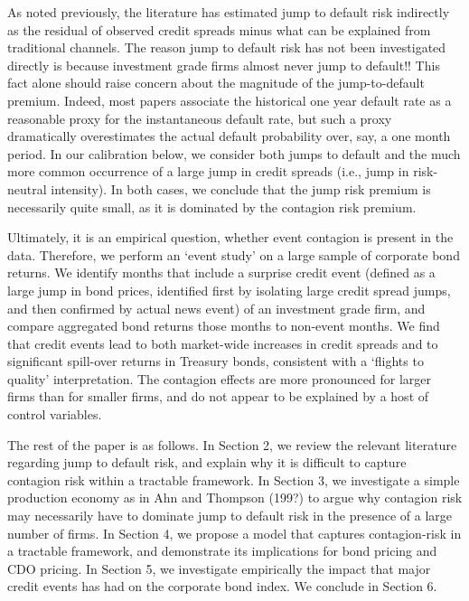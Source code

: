 \documentclass[titlepage,11pt]{article}
\begin{document}
As noted previously, the literature has estimated jump to default risk indirectly as
the residual of observed credit spreads minus what can be explained from traditional
channels.  The reason jump to default risk has not been investigated directly is because
investment grade firms almost never jump to default!! This fact alone should raise concern
about the magnitude of the jump-to-default premium.  Indeed, most papers associate
the historical one year default rate as a reasonable proxy for the instantaneous default rate,
but such a proxy dramatically overestimates the actual default probability over, say, a one month
period.  In our calibration below, we consider both jumps to default and the much more common
occurrence of a large jump in credit spreads (i.e., jump in risk-neutral intensity).  In both
cases, we conclude that the jump risk premium is necessarily quite small, as it is dominated
by the contagion risk premium.

Ultimately, it is an empirical question, whether event contagion is
present in the data. Therefore, we perform  an `event study' on a
large sample of corporate bond returns. We identify months that
include a surprise credit event (defined as a large jump in bond
prices, identified first by isolating large credit
spread jumps, and then confirmed by actual news event) of
an investment grade firm, and compare aggregated bond returns those
months to non-event months. We find that credit events lead to both market-wide
increases in credit spreads and to significant spill-over
returns in Treasury bonds, consistent with a  `flights to quality'
interpretation. The contagion effects are more pronounced for larger
firms than for smaller firms, and do not appear to be explained by a
host of control variables.

The rest of the paper is as follows.  In Section 2, we review the
relevant literature regarding jump to default risk, and explain why it is difficult
to capture contagion risk within a tractable framework.  In Section 3, we investigate
a simple production economy as in Ahn and Thompson (199?) to argue why contagion risk
may necessarily have to dominate jump to default risk in the presence of a large number
of firms.  In Section 4, we propose a model that captures contagion-risk in a tractable
framework, and demonstrate its implications for bond pricing and CDO pricing.  In Section 5,
we investigate empirically the impact that major credit events has had on the corporate bond
index. We conclude in Section 6.
\end{document}
